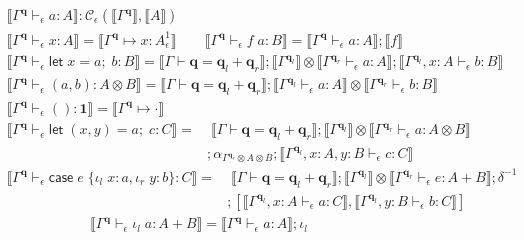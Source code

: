 \documentclass[acmsmall,screen,review]{acmart}
\newcommand{\mc}[1]{\ensuremath{\mathcal{#1}}}
\newcommand{\mb}[1]{\ensuremath{\mathbf{#1}}}
\newcommand{\ms}[1]{\ensuremath{\mathsf{#1}}}
\newcommand{\lto}{:}
\newcommand{\linl}[1]{\iota_l\;{#1}}
\newcommand{\linr}[1]{\iota_r\;{#1}}
\newcommand{\letexpr}[3]{\ensuremath{\ms{let}\;#1 = #2;\;#3}}
\newcommand{\caseexpr}[5]{\ms{case}\;#1\;\{\linl{#2} \lto #3, \linr{#4} \lto #5\}}
\newcommand{\qsp}[4]{#1 \vdash #2 = #3 + #4}
\newcommand{\cwk}[2]{#1 \mapsto #2}
\newcommand{\hasty}[4]{#1 \vdash_{#2} #3: {#4}}
\newcommand{\dnt}[1]{\llbracket{#1}\rrbracket}
\newcommand{\oneq}{1}
\begin{document}
\begin{figure}
  \begin{adjustbox}{minipage=1.1\textwidth,scale=0.9}
  \begin{gather*}
    \boxed{\dnt{\hasty{\Gamma^{\mb{q}}}{\epsilon}{a}{A}} 
      : \mc{C}_\epsilon(\dnt{\Gamma^{\mb{q}}}, \dnt{A})} \\
    \dnt{\hasty{\Gamma^{\mb{q}}}{\epsilon}{x}{A}} 
      = \dnt{\cwk{\Gamma^{\mb{q}}}{x : A^\oneq_\epsilon}}
    \qquad
    \dnt{\hasty{\Gamma^{\mb{q}}}{\epsilon}{f\;a}{B}} 
      = \dnt{\hasty{\Gamma^{\mb{q}}}{\epsilon}{a}{A}} ; \dnt{f} \\
    \dnt{\hasty{\Gamma^{\mb{q}}}{\epsilon}{\letexpr{x}{a}{b}}{B}} 
      = \dnt{\qsp{\Gamma}{\mb{q}}{\mb{q}_l}{\mb{q}_r}}
      ; \dnt{\Gamma^{\mb{q}_l}} 
        \otimes \dnt{\hasty{\Gamma^{\mb{q}_r}}{\epsilon}{a}{A}}
      ; \dnt{\hasty{\Gamma^{\mb{q}_l}, x : A}{\epsilon}{b}{B}}
    \\
    \dnt{\hasty{\Gamma^{\mb{q}}}{\epsilon}{(a, b)}{A \otimes B}}
      = \dnt{\qsp{\Gamma}{\mb{q}}{\mb{q}_l}{\mb{q}_r}}
      ; \dnt{\hasty{\Gamma^{\mb{q}_l}}{\epsilon}{a}{A}}
      \otimes \dnt{\hasty{\Gamma^{\mb{q}_r}}{\epsilon}{b}{B}}
    \\
    \dnt{\hasty{\Gamma^{\mb{q}}}{\epsilon}{()}{\mb{1}}}
      = \dnt{\cwk{\Gamma^{\mb{q}}}{\cdot}}
  \end{gather*}
  \begin{align*}
    \dnt{\hasty{\Gamma^{\mb{q}}}{\epsilon}{\letexpr{(x, y)}{a}{c}}{C}}
    = & \; \dnt{\qsp{\Gamma}{\mb{q}}{\mb{q}_l}{\mb{q}_r}}
      ; \dnt{\Gamma^{\mb{q}_l}}
      \otimes \dnt{\hasty{\Gamma^{\mb{q}_r}}{\epsilon}{a}{A \otimes B}}
    \\ & 
    ; \alpha_{\Gamma^{\mb{q}_r} \otimes A \otimes B}
    ; \dnt{\hasty{\Gamma^{\mb{q}_l}, x : A, y : B}{\epsilon}{c}{C}}
  \end{align*}
  \begin{align*}
    \dnt{\hasty{\Gamma^{\mb{q}}}{\epsilon}{\caseexpr{e}{x}{a}{y}{b}}{C}}
    =& \; 
    \dnt{\qsp{\Gamma}{\mb{q}}{\mb{q}_l}{\mb{q}_r}}
    ; \dnt{\Gamma^{\mb{q}_l}} 
    \otimes \dnt{\hasty{\Gamma^{\mb{q}_r}}{\epsilon}{e}{A + B}}
    ; \delta^{-1} \\ & 
    ; [
      \dnt{\hasty{\Gamma^{\mb{q}_l}, x : A}{\epsilon}{a}{C}},
      \dnt{\hasty{\Gamma^{\mb{q}_l}, y : B}{\epsilon}{b}{C}}
    ]
  \end{align*}
  \begin{gather*}
    \dnt{\hasty{\Gamma^{\mb{q}}}{\epsilon}{\linl{a}}{A + B}}
    = \dnt{\hasty{\Gamma^{\mb{q}}}{\epsilon}{a}{A}} ; \iota_l \qquad

\end{gather*}
\end{adjustbox}
\end{figure}
\end{document}

